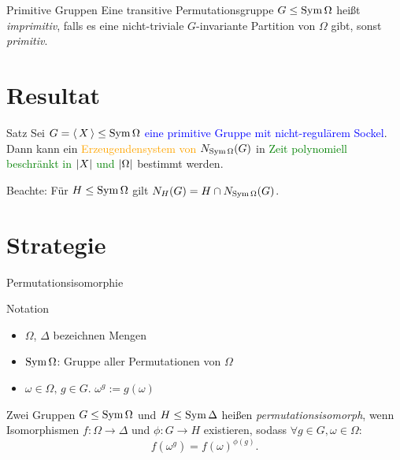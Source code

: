 
\begin{frame}{Primitive Gruppen}
\pause
Eine transitive Permutationsgruppe $G \leq \operatorname{Sym} \Omega$ heißt
\emph{imprimitiv},
\pause
falls es eine nicht-triviale
$G$-invariante Partition von $\Omega$ gibt,
\pause
sonst \emph{primitiv}.

\pause
{}
\end{frame}


\section{Resultat}
\begin{frame}%
\begin{block}{Satz}
Sei \textcolor{blue}{$G =  \left\langle \, X \, \right\rangle  \leq \operatorname{Sym} \Omega$ eine primitive Gruppe
mit nicht-regulärem Sockel}.
\pause
Dann kann ein
\textcolor{orange}{Erzeugendensystem von $N_{\operatorname{Sym} \Omega}(G)$}
\pause
in
\textcolor{green}{Zeit polynomiell beschränkt in $ \left| X \right| $ und $ \left| \Omega \right| $} bestimmt werden.
\end{block}
\vspace{1.5em}
\pause
Beachte: Für $H \leq \operatorname{Sym} \Omega$ gilt
$N_{H}(G) = H \cap N_{\operatorname{Sym} \Omega}(G)$.
\end{frame}


\section{Strategie}
\begin{frame}{Permutationsisomorphie}
\pause
\begin{block}{Notation}
\begin{itemize}
\item
$\Omega$, $\Delta$ bezeichnen Mengen
\item
$\operatorname{Sym} \Omega$:
Gruppe aller Permutationen von $\Omega$
\item
$\omega \in \Omega,\, g \in G$. $\omega ^ g := g(\omega)$
\end{itemize}
\end{block}

\pause
Zwei Gruppen $G \leq \operatorname{Sym} \Omega$ und $H \leq \operatorname{Sym} \Delta$ heißen
\emph{permutationsisomorph}, wenn
Isomorphismen $f : \Omega \to \Delta$ und $\phi : G \to H$ existieren,
sodass
$\forall g \in G, \omega \in \Omega$:
\[
    f( \omega ^ g ) = f(\omega) ^ {\phi(g)}.
\]
\end{frame}

